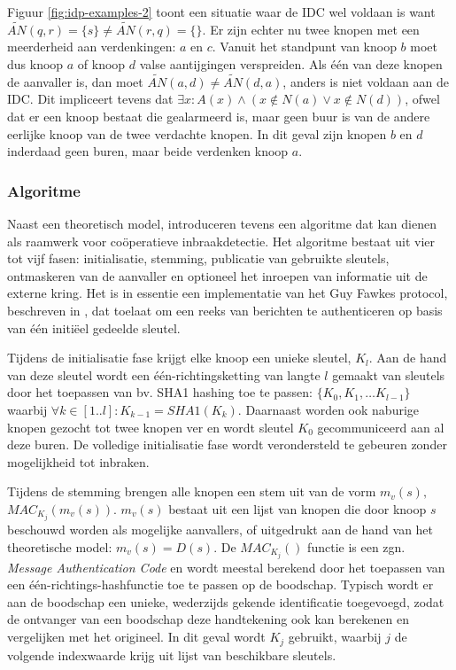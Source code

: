 Figuur \ref{fig:idp-examples-2} toont een situatie waar de IDC wel voldaan is
want $\tilde{AN}(q,r) = \{s\} \not= \tilde{AN}(r,q) = \{\}$. Er zijn echter nu
twee knopen met een meerderheid aan verdenkingen: $a$ en $c$. Vanuit het
standpunt van knoop $b$ moet dus knoop $a$ of knoop $d$ valse aantijgingen
verspreiden. Als \'e\'en van deze knopen de aanvaller is, dan moet
$\tilde{AN}(a,d) \not= \tilde{AN}(d,a)$, anders is niet voldaan aan de IDC. Dit
impliceert tevens dat $\exists x : A(x) \wedge ( x \not\in N(a) \vee x \not\in
N(d) )$, ofwel dat er een knoop bestaat die gealarmeerd is, maar geen buur is
van de andere eerlijke knoop van de twee verdachte knopen. In dit geval zijn
knopen $b$ en $d$ inderdaad geen buren, maar beide verdenken knoop $a$.

\subsubsection*{Algoritme}
\label{subsubsection:cooperation-algorithm}

Naast een theoretisch model, introduceren \cite{krontiris2009cooperative}
tevens een algoritme dat kan dienen als raamwerk voor co\"operatieve
inbraakdetectie. Het algoritme bestaat uit vier tot vijf fasen: initialisatie,
stemming, publicatie van gebruikte sleutels, ontmaskeren van de aanvaller en
optioneel het inroepen van informatie uit de externe kring. Het is in essentie
een implementatie van het Guy Fawkes protocol, beschreven in
\cite{anderson1998new}, dat toelaat om een reeks van berichten te authenticeren
op basis van \'e\'en initi\"eel gedeelde sleutel.

Tijdens de initialisatie fase krijgt elke knoop een unieke sleutel, $K_l$. Aan
de hand van deze sleutel wordt een \'e\'en-richtingsketting van langte $l$
gemaakt van sleutels door het toepassen van bv. SHA1 \cite{rfc:3174} hashing
toe te passen: $\{K_0, K_1, \dots K_{l-1}\}$ waarbij $\forall k \in [1..l] :
K_{k-1} = SHA1(K_k)$. Daarnaast worden ook naburige knopen gezocht tot twee
knopen ver en wordt sleutel $K_0$ gecommuniceerd aan al deze buren. De
volledige initialisatie fase wordt verondersteld te gebeuren zonder
mogelijkheid tot inbraken.

Tijdens de stemming brengen alle knopen een stem uit van de vorm $m_v(s),$ $
MAC_{K_j}(m_v(s))$. $m_v(s)$ bestaat uit een lijst van knopen die door knoop
$s$ beschouwd worden als mogelijke aanvallers, of uitgedrukt aan de hand van
het theoretische model: $m_v(s) = D(s)$. De $MAC_{K_j}()$ functie is een zgn.
\emph{Message Authentication Code} \cite{rfc:2104} en wordt meestal berekend
door het toepassen van een \'e\'en-richtings-hashfunctie toe te passen op de
boodschap. Typisch wordt er aan de boodschap een unieke, wederzijds gekende
identificatie toegevoegd, zodat de ontvanger van een boodschap deze
handtekening ook kan berekenen en vergelijken met het origineel. In dit geval
wordt $K_j$ gebruikt, waarbij $j$ de volgende indexwaarde krijg uit lijst van
beschikbare sleutels.


